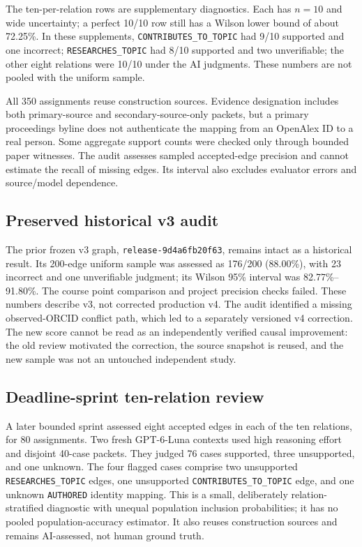 The ten-per-relation rows are supplementary diagnostics. Each has $n=10$ and
wide uncertainty; a perfect 10/10 row still has a Wilson lower bound of about
72.25\%. In these supplements, \texttt{CONTRIBUTES\_TO\_TOPIC} had 9/10 supported and
one incorrect; \texttt{RESEARCHES\_TOPIC} had 8/10 supported and two unverifiable;
the other eight relations were 10/10 under the AI judgments. These numbers are
not pooled with the uniform sample.


\FloatBarrier

All 350 assignments reuse construction sources. Evidence designation includes
both primary-source and secondary-source-only packets, but a primary proceedings
byline does not authenticate the mapping from an OpenAlex ID to a real person.
Some aggregate support counts were checked only through bounded paper witnesses.
The audit assesses sampled accepted-edge precision and cannot estimate the
recall of missing edges. Its interval also excludes evaluator errors and
source/model dependence.

\subsection{Preserved historical v3 audit}

The prior frozen v3 graph, \texttt{release-9d4a6fb20f63}, remains intact as a
historical result. Its 200-edge uniform sample was assessed as 176/200 (88.00\%),
with 23 incorrect and one unverifiable judgment; its Wilson 95\% interval was
82.77\%--91.80\%. The course point comparison and project precision checks
failed. These numbers describe v3, not corrected production v4. The audit
identified a missing observed-ORCID conflict path, which led to a separately
versioned v4 correction. The new score cannot be read as an independently
verified causal improvement: the old review motivated the correction, the source
snapshot is reused, and the new sample was not an untouched independent study.

\subsection{Deadline-sprint ten-relation review}

A later bounded sprint assessed eight accepted edges in each of the ten
relations, for 80 assignments. Two fresh GPT-6-Luna contexts used high reasoning
effort and disjoint 40-case packets. They judged 76 cases supported, three
unsupported, and one unknown. The four flagged cases comprise two unsupported
\texttt{RESEARCHES\_TOPIC} edges, one unsupported \texttt{CONTRIBUTES\_TO\_TOPIC} edge, and
one unknown \texttt{AUTHORED} identity mapping. This is a small, deliberately
relation-stratified diagnostic with unequal population inclusion probabilities;
it has no pooled population-accuracy estimator. It also reuses construction
sources and remains AI-assessed, not human ground truth.


